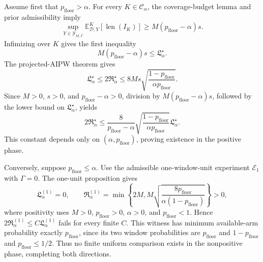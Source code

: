 Assume first that \(p_{\mathrm{floor}}>\alpha\).  For every \(K\in\mathcal C_\alpha\), the coverage-budget lemma and prior admissibility imply
\[
 \sup_{Y\in\mathcal Y_{M,\Gamma}}
 \mathbb E^K_{\mathcal D,Y}[\operatorname{len}(I_K)]
 \ge M(p_{\mathrm{floor}}-\alpha)s.
\]
Infimizing over \(K\) gives the first inequality
\[
 M(p_{\mathrm{floor}}-\alpha)s\le\mathfrak L_\alpha^\star.
\]
The projected-AIPW theorem gives
\[
 \mathfrak L_\alpha^\star\le2\mathfrak R_\alpha^\star
 \le8Ms\sqrt{\frac{1-p_{\mathrm{floor}}}{\alpha p_{\mathrm{floor}}}}.
\]
Since \(M>0\), \(s>0\), and \(p_{\mathrm{floor}}-\alpha>0\), division by \(M(p_{\mathrm{floor}}-\alpha)s\), followed by the lower bound on \(\mathfrak L_\alpha^\star\), yields
\[
 2\mathfrak R_\alpha^\star
 \le\frac{8}{p_{\mathrm{floor}}-\alpha}
 \sqrt{\frac{1-p_{\mathrm{floor}}}{\alpha p_{\mathrm{floor}}}}
 \mathfrak L_\alpha^\star.
\]
This constant depends only on \((\alpha,p_{\mathrm{floor}})\), proving existence in the positive phase.

Conversely, suppose \(p_{\mathrm{floor}}\le\alpha\).  Use the admissible one-window-unit experiment \(\mathcal E_1\) with \(\Gamma=0\).  The one-unit proposition gives
\[
 \mathfrak L_\alpha^{(1)}=0,
 \qquad
 \mathfrak R_\alpha^{(1)}=
 \min\left\{2M,M\sqrt{\frac{8p_{\mathrm{floor}}}
 {\alpha(1-p_{\mathrm{floor}})}}\right\}>0,
\]
where positivity uses \(M>0\), \(p_{\mathrm{floor}}>0\), \(\alpha>0\), and \(p_{\mathrm{floor}}<1\).  Hence \(2\mathfrak R_\alpha^{(1)}\le C\mathfrak L_\alpha^{(1)}\) fails for every finite \(C\).  This witness has minimum available-arm probability exactly \(p_{\mathrm{floor}}\), since its two window probabilities are \(p_{\mathrm{floor}}\) and \(1-p_{\mathrm{floor}}\) and \(p_{\mathrm{floor}}\le1/2\).  Thus no finite uniform comparison exists in the nonpositive phase, completing both directions.

